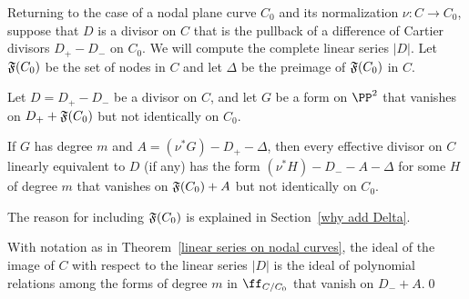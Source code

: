 Returning to the case of a nodal plane curve $C_{0}$ and its normalization $\nu: C\to C_{0}$,
suppose that $D$ is a divisor on $C$ that is the pullback of a difference of Cartier
divisors $D_{+}-D_{-}$ on $C_{0}$. We will compute the complete linear series $|D|$.
Let $\adj(C_{0})$ be the set of nodes in $C$ and let $\Delta$ be the preimage of $\adj(C_{0})$ in $C$.

\begin{theorem}\label{linear series on nodal curves}
Let $D = D_{+}-D_{-}$ be a divisor on $C$, and let $G$ be a form on $\PP^{2}$ 
that vanishes on  $D_{+}+\adj(C_{0})$ but not identically on $C_{0}$.

If $G$ has degree $m$ and $A = (\nu^{*}G)-D_{+}-\Delta$, then every effective divisor on
$C$ linearly equivalent to $D$ (if any) has the form $(\nu^*H)-D_{-}-A-\Delta$ for some $H$ of degree $m$
that vanishes on $\adj(C_{0})+A$ but not identically on $C_{0}$.
\end{theorem}
 
 The reason for including $\adj(C_{0})$ is explained in Section~\ref{why add Delta}.
\begin{corollary}
With notation as in Theorem~\ref{linear series on nodal curves}, the ideal of the image of
$C$ with respect to the linear series $|D|$ is the ideal of polynomial relations among the forms
of degree $m$ in $\ff_{C/C_{0}}$ that vanish on $D_{-}+ A$.\qed
\end{corollary}

